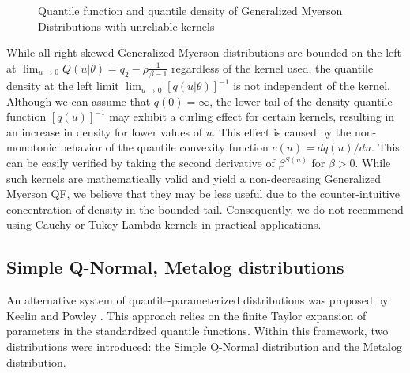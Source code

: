 \documentclass[
  fleqn,
  deca,
  blindrev
]{informs4}
\begin{document}
\begin{figure}


\caption{\label{fig-gmyerson-qfdqf-plot2}Quantile function and quantile
density of Generalized Myerson Distributions with unreliable kernels}

\end{figure}%

While all right-skewed Generalized Myerson distributions are bounded on
the left at
\(\lim_{u\rightarrow0}Q(u\vert\theta)=q_2-\rho\frac{1}{\beta-1}\)
regardless of the kernel used, the quantile density at the left limit
\(\lim_{u\rightarrow0}[q(u\vert\theta)]^{-1}\) is not independent of the
kernel. Although we can assume that \(q(0)=\infty\), the lower tail of
the density quantile function \([q(u)]^{-1}\) may exhibit a curling
effect for certain kernels, resulting in an increase in density for
lower values of \(u\). This effect is caused by the non-monotonic
behavior of the quantile convexity function \(c(u)=dq(u)/du\). This can
be easily verified by taking the second derivative of \(\beta^{S(u)}\)
for \(\beta>0\). While such kernels are mathematically valid and yield a
non-decreasing Generalized Myerson QF, we believe that they may be less
useful due to the counter-intuitive concentration of density in the
bounded tail. Consequently, we do not recommend using Cauchy or Tukey
Lambda kernels in practical applications.

\subsection{Simple Q-Normal, Metalog
distributions}\label{simple-q-normal-metalog-distributions}

An alternative system of quantile-parameterized distributions was
proposed by Keelin and Powley
\citep{keelin2011QuantileParameterizedDistributions, powley2013QuantileFunctionMethods}.
This approach relies on the finite Taylor expansion of parameters in the
standardized quantile functions. Within this framework, two
distributions were introduced: the Simple Q-Normal distribution and the
Metalog distribution.
\end{document}
